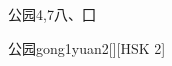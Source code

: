 \begin{entry}{公园}{4,7}{⼋、⼞}
  \begin{phonetics}{公园}{gong1yuan2}[][HSK 2]
  \end{phonetics}
\end{entry}
